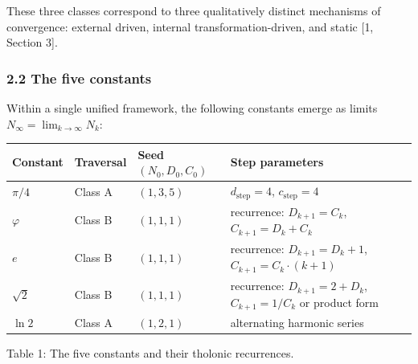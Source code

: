 \documentclass[
  11pt,
  letterpaper,
]{article}
\begin{document}
These three classes correspond to three qualitatively distinct
mechanisms of convergence: external driven, internal
transformation-driven, and static {[}1, Section 3{]}.

\subsubsection{2.2 The five constants}\label{the-five-constants}

Within a single unified framework, the following constants emerge as
limits \(N_\infty = \lim_{k \to \infty} N_k\):

\begin{longtable}[]{@{}
  >{\raggedright\arraybackslash}p{}
  >{\raggedright\arraybackslash}p{}
  >{\raggedright\arraybackslash}p{}
  >{\raggedright\arraybackslash}p{}@{}}
\toprule\noalign{}
\begin{minipage}[b]{\linewidth}\raggedright
Constant
\end{minipage} & \begin{minipage}[b]{\linewidth}\raggedright
Traversal
\end{minipage} & \begin{minipage}[b]{\linewidth}\raggedright
Seed \((N_0, D_0, C_0)\)
\end{minipage} & \begin{minipage}[b]{\linewidth}\raggedright
Step parameters
\end{minipage} \\
\midrule\noalign{}
\endhead
\bottomrule\noalign{}
\endlastfoot
\(\pi/4\) & Class A & \((1, 3, 5)\) & \(d_\text{step}=4\),
\(c_\text{step}=4\) \\
\(\varphi\) & Class B & \((1, 1, 1)\) & recurrence: \(D_{k+1}=C_k\),
\(C_{k+1}=D_k+C_k\) \\
\(e\) & Class B & \((1, 1, 1)\) & recurrence: \(D_{k+1}=D_k+1\),
\(C_{k+1}=C_k \cdot (k+1)\) \\
\(\sqrt{2}\) & Class B & \((1, 1, 1)\) & recurrence: \(D_{k+1}=2+D_k\),
\(C_{k+1}=1/C_k\) or product form \\
\(\ln 2\) & Class A & \((1, 2, 1)\) & alternating harmonic series \\
\end{longtable}

Table 1: The five constants and their tholonic recurrences.
\end{document}
